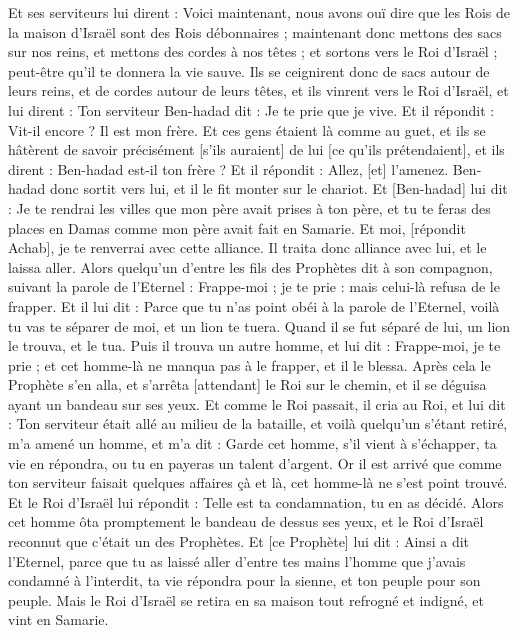 \begin{multicols}{2}
Et ses serviteurs lui dirent : Voici maintenant, nous avons ouï dire que les Rois de la maison d'Israël sont des Rois débonnaires ; maintenant donc mettons des sacs sur nos reins, et mettons des cordes à nos têtes ; et sortons vers le Roi d'Israël ; peut-être qu'il te donnera la vie sauve.
Ils se ceignirent donc de sacs autour de leurs reins, et de cordes autour de leurs têtes, et ils vinrent vers le Roi d'Israël, et lui dirent : Ton serviteur Ben-hadad dit : Je te prie que je vive. Et il répondit : Vit-il encore ? Il est mon frère.
Et ces gens étaient là comme au guet, et ils se hâtèrent de savoir précisément [s'ils auraient] de lui [ce qu'ils prétendaient], et ils dirent : Ben-hadad est-il ton frère ? Et il répondit : Allez, [et] l'amenez. Ben-hadad donc sortit vers lui, et il le fit monter sur le chariot.
Et [Ben-hadad] lui dit : Je te rendrai les villes que mon père avait prises à ton père, et tu te feras des places en Damas comme mon père avait fait en Samarie. Et moi, [répondit Achab], je te renverrai avec cette alliance. Il traita donc alliance avec lui, et le laissa aller.
Alors quelqu'un d'entre les fils des Prophètes dit à son compagnon, suivant la parole de l'Eternel : Frappe-moi ; je te prie : mais celui-là refusa de le frapper.
Et il lui dit : Parce que tu n'as point obéi à la parole de l'Eternel, voilà tu vas te séparer de moi, et un lion te tuera. Quand il se fut séparé de lui, un lion le trouva, et le tua.
Puis il trouva un autre homme, et lui dit : Frappe-moi, je te prie ; et cet homme-là ne manqua pas à le frapper, et il le blessa.
Après cela le Prophète s'en alla, et s'arrêta [attendant] le Roi sur le chemin, et il se déguisa ayant un bandeau sur ses yeux.
Et comme le Roi passait, il cria au Roi, et lui dit : Ton serviteur était allé au milieu de la bataille, et voilà quelqu'un s'étant retiré, m'a amené un homme, et m'a dit : Garde cet homme, s'il vient à s'échapper, ta vie en répondra, ou tu en payeras un talent d'argent.
Or il est arrivé que comme ton serviteur faisait quelques affaires çà et là, cet homme-là ne s'est point trouvé. Et le Roi d'Israël lui répondit : Telle est ta condamnation, tu en as décidé.
Alors cet homme ôta promptement le bandeau de dessus ses yeux, et le Roi d'Israël reconnut que c'était un des Prophètes.
Et [ce Prophète] lui dit : Ainsi a dit l'Eternel, parce que tu as laissé aller d'entre tes mains l'homme que j'avais condamné à l'interdit, ta vie répondra pour la sienne, et ton peuple pour son peuple.
Mais le Roi d'Israël se retira en sa maison tout refrogné et indigné, et vint en Samarie.

\end{multicols}
